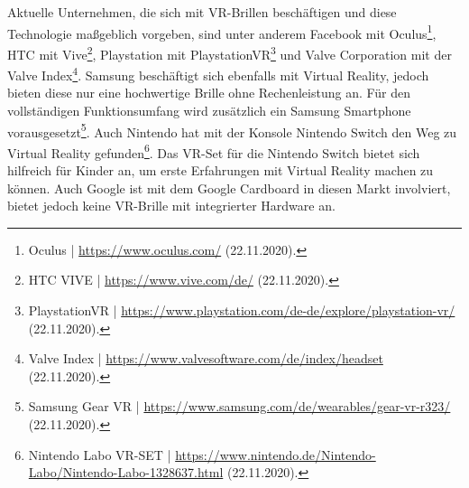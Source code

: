 \documentclass[a4paper,12pt,oneside]{article}
\begin{document}
        Aktuelle Unternehmen, die sich mit VR-Brillen beschäftigen und diese Technologie
        maßgeblich vorgeben, sind unter anderem Facebook mit Oculus\footnote{Oculus | \url{https://www.oculus.com/} (22.11.2020).}, 
        HTC mit Vive\footnote{HTC VIVE | \url{https://www.vive.com/de/} (22.11.2020).},
        Playstation mit PlaystationVR\footnote{PlaystationVR | \url{https://www.playstation.com/de-de/explore/playstation-vr/} (22.11.2020).}
        und Valve Corporation mit der Valve Index\footnote{Valve Index | \url{https://www.valvesoftware.com/de/index/headset} (22.11.2020).}.
        Samsung beschäftigt sich ebenfalls mit Virtual
        Reality, jedoch bieten diese nur eine hochwertige Brille ohne Rechenleistung an.
        Für den vollständigen Funktionsumfang wird zusätzlich ein Samsung Smartphone vorausgesetzt\footnote{Samsung Gear VR | \url{https://www.samsung.com/de/wearables/gear-vr-r323/} (22.11.2020).}.
        Auch Nintendo hat mit der Konsole Nintendo Switch den Weg zu Virtual Reality
        gefunden\footnote{Nintendo Labo VR-SET | \url{https://www.nintendo.de/Nintendo-Labo/Nintendo-Labo-1328637.html} (22.11.2020).}.
        Das VR-Set für die Nintendo Switch bietet sich hilfreich für Kinder an, um erste 
        Erfahrungen mit Virtual Reality machen zu können.
        Auch Google ist mit dem Google Cardboard in diesen Markt involviert, bietet jedoch keine 
        VR-Brille mit integrierter Hardware an.
\end{document}
